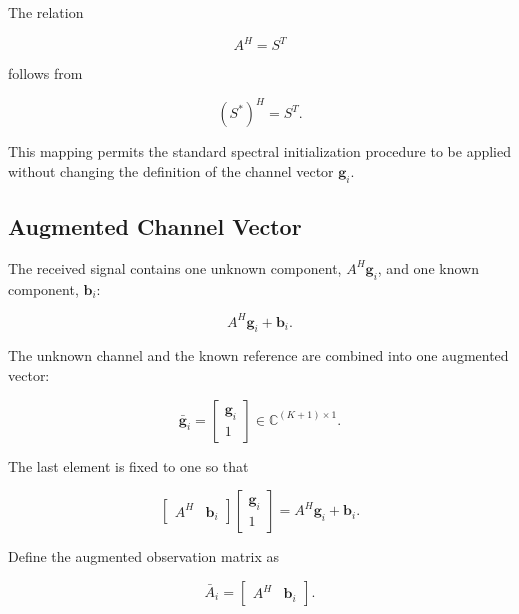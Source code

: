 \documentclass[12pt,a4paper]{article}
\begin{document}
The relation

\begin{equation}
A^H=S^T
\tag{242}
\end{equation}

follows from

\begin{equation}
(S^*)^H=S^T.
\tag{243}
\end{equation}

This mapping permits the standard spectral initialization procedure to be applied without changing the definition of the channel vector $\mathbf g_i$.

\subsection{Augmented Channel Vector}

The received signal contains one unknown component, \(A^H\mathbf g_i\), and one known component, \(\mathbf b_i\):

\begin{equation}
A^H\mathbf g_i+\mathbf b_i.
\tag{244}
\end{equation}

The unknown channel and the known reference are combined into one augmented vector:

\begin{equation}
\boxed{
\bar{\mathbf g}_i
=
\begin{bmatrix}
\mathbf g_i\\
1
\end{bmatrix}
\in
\mathbb C^{(K+1)\times1}
}.
\tag{245}
\end{equation}

The last element is fixed to one so that

\begin{equation}
\begin{bmatrix}
A^H & \mathbf b_i
\end{bmatrix}
\begin{bmatrix}
\mathbf g_i\\
1
\end{bmatrix}
=
A^H\mathbf g_i+\mathbf b_i.
\tag{246}
\end{equation}

Define the augmented observation matrix as

\begin{equation}
\boxed{
\bar A_i
=
\begin{bmatrix}
A^H & \mathbf b_i
\end{bmatrix}
}.
\tag{247}
\end{equation}
\end{document}
